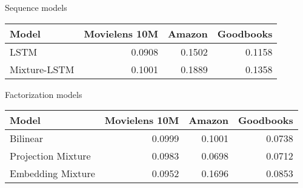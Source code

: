 \begin{subtable}{\columnwidth}
\caption{Sequence models}
\begin{tabularx}{\columnwidth}{lrrr}
\toprule
 Model        &   Movielens 10M &   Amazon &   Goodbooks \\
\midrule
 LSTM         &          0.0908 &   0.1502 &      0.1158 \\
 Mixture-LSTM &          0.1001 &   0.1889 &      0.1358 \\
\bottomrule
\end{tabularx}
\end{subtable}
\hspace{\fill}
\begin{subtable}{\columnwidth}
\caption{Factorization models}
\begin{tabularx}{\columnwidth}{lrrr}
\toprule
 Model              &   Movielens 10M &   Amazon &   Goodbooks \\
\midrule
 Bilinear           &          0.0999 &   0.1001 &      0.0738 \\
 Projection Mixture &          0.0983 &   0.0698 &      0.0712 \\
 Embedding Mixture  &          0.0952 &   0.1696 &      0.0853 \\
\bottomrule
\end{tabularx}
\end{subtable}